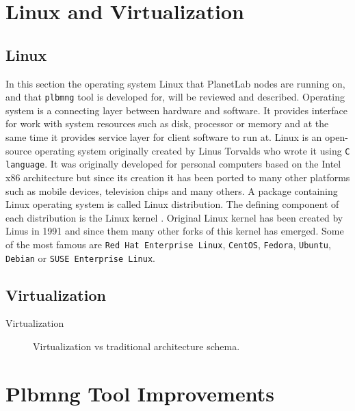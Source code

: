 \chapter{Linux and Virtualization}
\label{chapter:Linux}
\section{Linux}
In this section the operating system Linux that PlanetLab nodes are running on, and that \texttt{plbmng} tool is developed for, will be reviewed and described. Operating system is a connecting layer between hardware and software. It provides interface for work with system resources such as disk, processor or memory and at the same time it provides service layer for client software to run at. Linux is an open-source operating system originally created by Linus Torvalds who wrote it using \texttt{C language}. It was originally developed for personal computers based on the Intel x86 architecture but since its creation it has been ported to many other platforms such as mobile devices, television chips and many others. A package containing Linux operating system is called Linux distribution. The defining component of each distribution is the Linux kernel \cite{eckert2012linux+}. Original Linux kernel has been created by Linus in 1991 \cite{linuxintro} and since them many other forks of this kernel has emerged. Some of the most famous are \texttt{Red Hat Enterprise Linux},  \texttt{CentOS}, \texttt{Fedora}, \texttt{Ubuntu},  \texttt{Debian} or \texttt{SUSE Enterprise Linux}.\\
\section{Virtualization}
Virtualization 

\begin{figure}[H]
	\centering
	\caption{Virtualization vs traditional architecture schema.}
	\label{fig:virtschema}
\end{figure}


\chapter{Plbmng Tool Improvements}
\label{chapter:improve}
